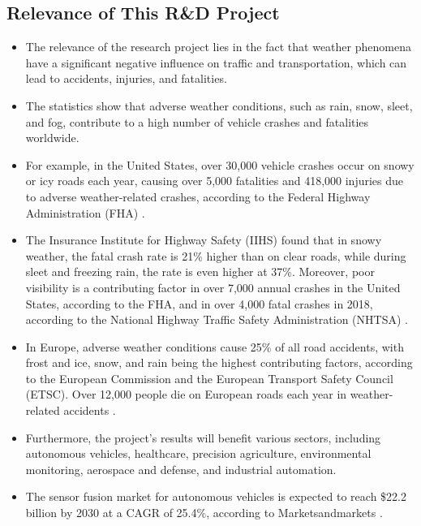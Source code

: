 \documentclass[rnd]{mas_proposal}
\begin{document}
\subsection{Relevance of This R\&D Project}
\begin{itemize}

    \item The relevance of the research project lies in the fact that weather phenomena have a significant negative influence on traffic and transportation, which can lead to accidents, injuries, and fatalities.

    \item The statistics show that adverse weather conditions, such as rain, snow, sleet, and fog, contribute to a high number of vehicle crashes and fatalities worldwide.

    \item For example, in the United States, over 30,000 vehicle crashes occur on snowy or icy roads each year, causing over 5,000 fatalities and 418,000 injuries due to adverse weather-related crashes, according to the Federal Highway Administration (FHA) \cite{federal-highway-administration-no-date} \cite{usDepartmentofCommerce2016}.

    \item The Insurance Institute for Highway Safety (IIHS) found that in snowy weather, the fatal crash rate is 21\% higher than on clear roads, while during sleet and freezing rain, the rate is even higher at 37\%. Moreover, poor visibility is a contributing factor in over 7,000 annual crashes in the United States, according to the FHA, and in over 4,000 fatal crashes in 2018, according to the National Highway Traffic Safety Administration (NHTSA) \cite{brumbelow2022light}.

    \item In Europe, adverse weather conditions cause 25\% of all road accidents, with frost and ice, snow, and rain being the highest contributing factors, according to the European Commission and the European Transport Safety Council (ETSC). Over 12,000 people die on European roads each year in weather-related accidents \cite{cookson-2022}.

    \item Furthermore, the project's results will benefit various sectors, including autonomous vehicles, healthcare, precision agriculture, environmental monitoring, aerospace and defense, and industrial automation.

    \item The sensor fusion market for autonomous vehicles is expected to reach \$22.2 billion by 2030 at a CAGR of 25.4\%, according to Marketsandmarkets \cite{marketsandmarkets}.


\end{itemize}
\end{document}
